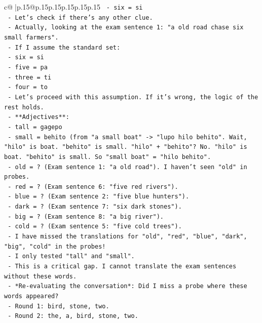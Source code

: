 \documentclass{article}
\begin{document}
{\begin{supertabular}{c@{$\;$}|p{.15\linewidth}@{}p{.15\linewidth}p{.15\linewidth}p{.15\linewidth}p{.15\linewidth}p{.15\linewidth}}
{{{\texttt{      {-} six = si} \\
\texttt{    {-} Let's check if there's any other clue.} \\
\texttt{    {-} Actually, looking at the exam sentence 1: "a old road chase six small farmers".} \\
\texttt{    {-} If I assume the standard set:} \\
\texttt{      {-} six = si} \\
\texttt{      {-} five = pa} \\
\texttt{      {-} three = ti} \\
\texttt{      {-} four = to} \\
\texttt{    {-} Let's proceed with this assumption. If it's wrong, the logic of the rest holds.} \\
\texttt{    {-} **Adjectives**:} \\
\texttt{      {-} tall = gagepo} \\
\texttt{      {-} small = behito (from "a small boat" {-}> "lupo hilo behito". Wait, "hilo" is boat. "behito" is small. "hilo" + "behito"? No. "hilo" is boat. "behito" is small. So "small boat" = "hilo behito".} \\
\texttt{      {-} old = ? (Exam sentence 1: "a old road"). I haven't seen "old" in probes.} \\
\texttt{      {-} red = ? (Exam sentence 6: "five red rivers").} \\
\texttt{      {-} blue = ? (Exam sentence 2: "five blue hunters").} \\
\texttt{      {-} dark = ? (Exam sentence 7: "six dark stones").} \\
\texttt{      {-} big = ? (Exam sentence 8: "a big river").} \\
\texttt{      {-} cold = ? (Exam sentence 5: "five cold trees").} \\
\texttt{    {-} I have missed the translations for "old", "red", "blue", "dark", "big", "cold" in the probes!} \\
\texttt{    {-} I only tested "tall" and "small".} \\
\texttt{    {-} This is a critical gap. I cannot translate the exam sentences without these words.} \\
\texttt{    {-} *Re{-}evaluating the conversation*: Did I miss a probe where these words appeared?} \\
\texttt{      {-} Round 1: bird, stone, two.} \\
\texttt{      {-} Round 2: the, a, bird, stone, two.} \\
}}}
\end{supertabular}}
\end{document}

